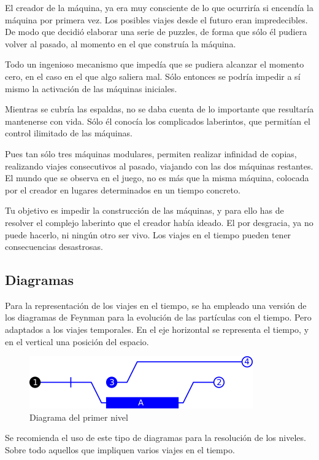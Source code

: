 \documentclass[11pt,a4paper]{article}
\begin{document}
El creador de la máquina, ya era muy consciente de lo que ocurriría si encendía 
la máquina por primera vez. Los posibles viajes desde el futuro eran 
impredecibles.  De modo que decidió elaborar una serie de puzzles, de forma que 
sólo él pudiera volver al pasado, al momento en el que construía la máquina.

Todo un ingenioso mecanismo que impedía que se pudiera alcanzar el momento cero, 
en el caso en el que algo saliera mal. Sólo entonces se podría impedir a sí 
mismo la activación de las máquinas iniciales.

Mientras se cubría las espaldas, no se daba cuenta de lo importante que 
resultaría mantenerse con vida. Sólo él conocía los complicados laberintos, que 
permitían el control ilimitado de las máquinas.

Pues tan sólo tres máquinas modulares, permiten realizar infinidad de copias, 
realizando viajes consecutivos al pasado, viajando con las dos máquinas 
restantes. El mundo que se observa en el juego, no es más que la misma máquina, 
colocada por el creador en lugares determinados en un tiempo concreto.

Tu objetivo es impedir la construcción de las máquinas, y para ello has de 
resolver el complejo laberinto que el creador había ideado. El por desgracia, ya 
no puede hacerlo, ni ningún otro ser vivo. Los viajes en el tiempo pueden tener 
consecuencias desastrosas.

\subsection{Diagramas}

Para la representación de los viajes en el tiempo, se ha empleado una versión de 
los diagramas de Feynman para la evolución de las partículas con el tiempo. Pero 
adaptados a los viajes temporales. En el eje horizontal se representa el tiempo, 
y en el vertical una posición del espacio.

\begin{figure}[htp]
\centering
\includegraphics{cronograma1.png}
\caption{Diagrama del primer nivel}
\label{}
\end{figure}

Se recomienda el uso de este tipo de diagramas para la resolución de los
niveles. Sobre todo aquellos que impliquen varios viajes en el tiempo.
\end{document}
